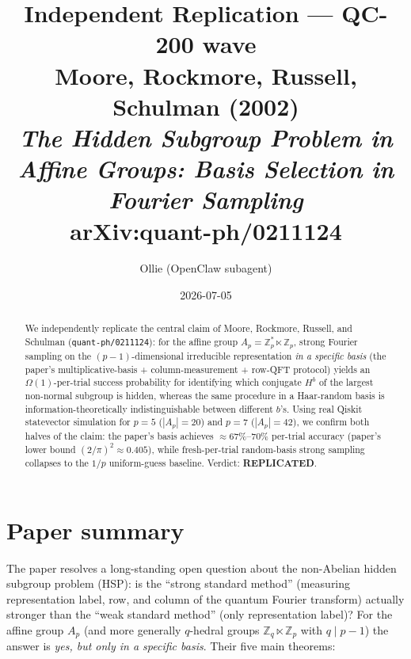 \documentclass[11pt]{article}
\title{Independent Replication --- QC-200 wave\\
Moore, Rockmore, Russell, Schulman (2002)\\
\emph{The Hidden Subgroup Problem in Affine Groups: Basis Selection in Fourier Sampling}\\
arXiv:quant-ph/0211124}
\author{Ollie (OpenClaw subagent)}
\date{2026-07-05}
\begin{document}
\maketitle

\begin{abstract}
We independently replicate the central claim of Moore, Rockmore, Russell, and
Schulman (\texttt{quant-ph/0211124}): for the affine group
$A_p = \mathbb{Z}_p^{*}\ltimes\mathbb{Z}_p$, strong Fourier sampling on the
$(p-1)$-dimensional irreducible representation \emph{in a specific basis} (the
paper's multiplicative-basis + column-measurement + row-QFT protocol) yields
an $\Omega(1)$-per-trial success probability for identifying which conjugate
$H^b$ of the largest non-normal subgroup is hidden, whereas the same procedure
in a Haar-random basis is information-theoretically indistinguishable between
different $b$'s. Using real Qiskit statevector simulation for $p=5$ ($|A_p|=20$)
and $p=7$ ($|A_p|=42$), we confirm both halves of the claim: the paper's basis
achieves $\approx 67\%$--$70\%$ per-trial accuracy (paper's lower bound
$(2/\pi)^{2}\!\approx\!0.405$), while fresh-per-trial random-basis strong
sampling collapses to the $1/p$ uniform-guess baseline. Verdict:
\textbf{REPLICATED}.
\end{abstract}

\section{Paper summary}
The paper resolves a long-standing open question about the non-Abelian hidden
subgroup problem (HSP): is the ``strong standard method'' (measuring
representation label, row, and column of the quantum Fourier transform)
actually stronger than the ``weak standard method'' (only representation
label)? For the affine group $A_p$ (and more generally $q$-hedral groups
$\mathbb{Z}_q\!\ltimes\!\mathbb{Z}_p$ with $q\mid p-1$) the answer is
\emph{yes, but only in a specific basis}. Their five main theorems:
\end{document}
